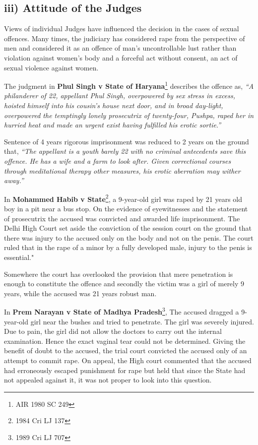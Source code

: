 \begin{multicols}{2}
\vspace{-.3cm}

\subsection*{iii) Attitude of the Judges}

\noi
Views of individual Judges have influenced the decision in the cases of sexual offences.
Many times, the judiciary has considered rape from the perspective of men and
considered it as an offence of man's uncontrollable lust rather than violation against
women’s body and a forceful act without consent, an act of sexual violence against
women.

\noi
The judgment in \textbf{Phul Singh v State of Haryana}\footnote{AIR 1980 SC 249} describes the offence as, \textit{“A
philanderer of 22, appellant Phul Singh, overpowered by sex stress in excess, hoisted
himself into his cousin's house next door, and in broad day-light, overpowered the
temptingly lonely prosecutrix of twenty-four, Pushpa, raped her in hurried heat and
made an urgent exist having fulfilled his erotic sortie.”}

\noi
Sentence of 4 years rigorous imprisonment was reduced to 2 years on the ground that,
\textit{“The appellant is a youth barely 22 with no criminal antecedents save this offence. He
has a wife and a farm to look after. Given correctional courses through meditational
therapy other measures, his erotic aberration may wither away.”}

\noi
In \textbf{Mohammed Habib v State}\footnote{1984 Cri LJ 137}, a 9-year-old girl was raped by 21 years old boy in a
pit near a bus stop. On the evidence of eyewitnesses and the statement of prosecutrix
the accused was convicted and awarded life imprisonment. The Delhi High Court set
aside the conviction of the session court on the ground that there was injury to the
accused only on the body and not on the penis. The court ruled that in the rape of a
minor by a fully developed male, injury to the penis is essential."

\noi
Somewhere the court has overlooked the provision that mere penetration is enough to
constitute the offence and secondly the victim was a girl of merely 9 years, while the
accused was 21 years robust man.

\noi
In \textbf{Prem Narayan v State of Madhya Pradesh}\footnote{1989 Cri LJ 707}, The accused dragged a 9-year-old
girl near the bushes and tried to penetrate. The girl was severely injured. Due to pain,
the girl did not allow the doctors to carry out the internal examination. Hence the exact
vaginal tear could not be determined. Giving the benefit of doubt to the accused, the
trial court convicted the accused only of an attempt to commit rape. On appeal, the High
court commented that the accused had erroneously escaped punishment for rape but
held that since the State had not appealed against it, it was not proper to look into this
question.


\end{multicols}

